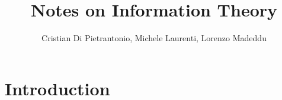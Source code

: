 \documentclass[a4paper, 11pt]{book}
\title{Notes on Information Theory}
\author{Cristian Di Pietrantonio, Michele Laurenti, Lorenzo Madeddu}
\begin{document}
	\maketitle
	
	\chapter{Introduction}
	
	
	
\end{document}
